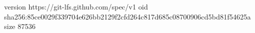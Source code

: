 version https://git-lfs.github.com/spec/v1
oid sha256:85ce0029f339704e626bb2129f2cfd264c817d685c08700906cd5bd81f54625a
size 87536
